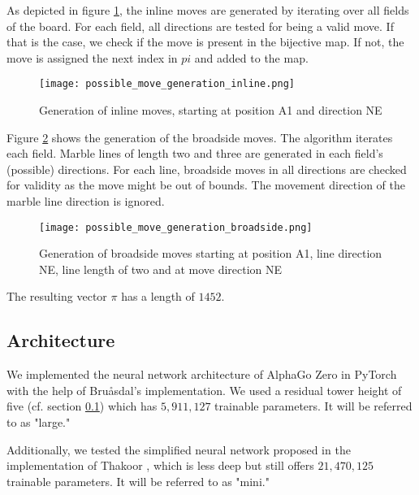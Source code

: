 \begin{enumerate}
          As depicted in figure \ref{possible_move_generation_inline}, the inline moves are generated by iterating over all fields of the board. For each field, all directions are tested for being a valid move. If that is the case, we check if the move is present in the bijective map. If not, the move is assigned the next index in $pi$ and added to the map.

          \begin{figure}
              \centering
              \texttt{[image: possible\_move\_generation\_inline.png]}
              \caption{Generation of inline moves, starting at position A1 and direction NE}
              \label{possible_move_generation_inline}
          \end{figure}

          Figure \ref{possible_move_generation_broadside} shows the generation of the broadside moves. The algorithm iterates each field. Marble lines of length two and three are generated in each field's (possible) directions. For each line, broadside moves in all directions are checked for validity as the move might be out of bounds. The movement direction of the marble line direction is ignored.

          \begin{figure}
              \centering
              \texttt{[image: possible\_move\_generation\_broadside.png]}
              \caption{Generation of broadside moves starting at position A1, line direction NE, line length of two and at move direction NE}
              \label{possible_move_generation_broadside}
          \end{figure}

          The resulting vector $\pi$ has a length of $1452$.
\end{enumerate}

\subsection{Architecture}
\label{neural_network_architecture}
We implemented the neural network architecture of AlphaGo Zero in PyTorch with the help of Bruåsdal's implementation. We used a residual tower height of five (cf. section \ref{neural_network_architecture}) which has $5,911,127$ trainable parameters. It will be referred to as "large."

Additionally, we tested the simplified neural network proposed in the implementation of Thakoor \cite{thakoor_suragnairalpha-zero-general_nodate}, which is less deep but still offers $21,470,125$ trainable parameters. It will be referred to as "mini."

